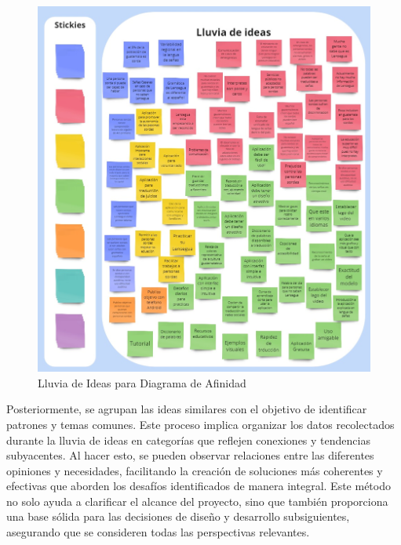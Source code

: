 \begin{figure} [H]
    \centering
    \includegraphics[width=0.75\linewidth]{figuras/lluevia_diagrama_afinidad.png}
    \caption{Lluvia de Ideas para Diagrama de Afinidad}
    \label{fig:enter-label}
\end{figure}

Posteriormente, se agrupan las ideas similares con el objetivo de identificar patrones y temas comunes. Este proceso implica organizar los datos recolectados durante la lluvia de ideas en categorías que reflejen conexiones y tendencias subyacentes. Al hacer esto, se pueden observar relaciones entre las diferentes opiniones y necesidades, facilitando la creación de soluciones más coherentes y efectivas que aborden los desafíos identificados de manera integral. Este método no solo ayuda a clarificar el alcance del proyecto, sino que también proporciona una base sólida para las decisiones de diseño y desarrollo subsiguientes, asegurando que se consideren todas las perspectivas relevantes.

